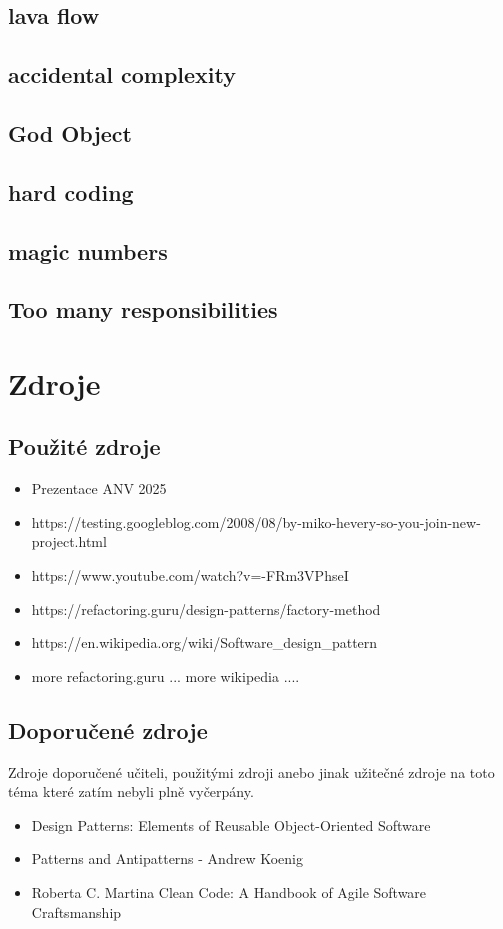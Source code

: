 \documentclass{article}
\begin{document}
\subsection{lava flow}

\subsection{accidental complexity}

\subsection{God Object}

\subsection{hard coding}

\subsection{magic numbers}

\subsection{Too many responsibilities}

\section{Zdroje}
\subsection{Použité zdroje}
\begin{itemize}
  \item Prezentace ANV 2025
  \item https://testing.googleblog.com/2008/08/by-miko-hevery-so-you-join-new-project.html
  \item https://www.youtube.com/watch?v=-FRm3VPhseI
  \item https://refactoring.guru/design-patterns/factory-method
  \item https://en.wikipedia.org/wiki/Software\_design\_pattern
  \item more refactoring.guru ... more wikipedia ....
\end{itemize}
\subsection{Doporučené zdroje}
Zdroje doporučené učiteli, použitými zdroji anebo jinak užitečné zdroje na toto téma které zatím nebyli plně vyčerpány.
\begin{itemize}
  \item Design Patterns: Elements of Reusable Object-Oriented Software
  \item Patterns and Antipatterns - Andrew Koenig
  \item Roberta C. Martina Clean Code: A Handbook of Agile Software
Craftsmanship

\end{itemize}
\end{document}
